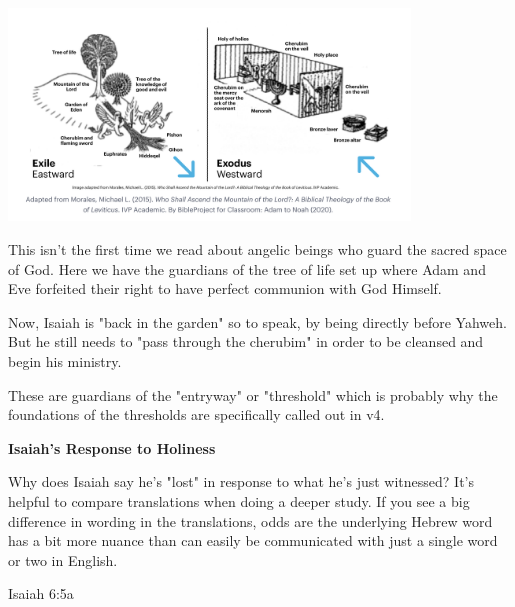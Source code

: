 \documentclass[11pt]{article}
\begin{document}
\begin{center}
\includegraphics[width=0.8\textwidth]{eden-temple.png}
\end{center}

{\vspace{2em}}

This isn't the first time we read about angelic beings who guard the sacred space of God. Here we have the guardians of the tree of life set up where Adam and Eve forfeited their right to have perfect communion with God Himself.

Now, Isaiah is "back in the garden" so to speak, by being directly before Yahweh. But he still needs to "pass through the cherubim" in order to be cleansed and begin his ministry.

These are guardians of the "entryway" or "threshold" which is probably why the foundations of the thresholds are specifically called out in v4.

{\vspace{4em}}
{\large\bfseries Isaiah's Response to Holiness}
{\vspace{1em}}

Why does Isaiah say he's "lost" in response to what he's just witnessed? It's helpful to compare translations when doing a deeper study.
If you see a big difference in wording in the translations, odds are the underlying Hebrew word has a bit more nuance than can easily be communicated with just a single word or two in English.
\begin{biblecomparison}{Isaiah 6:5a}
\end{biblecomparison}

\end{document}
